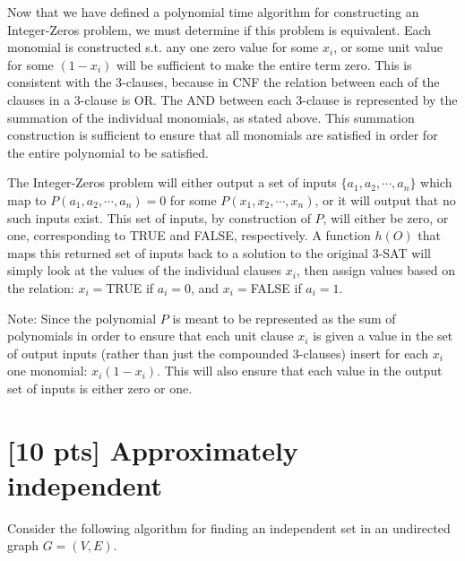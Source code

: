 \documentclass[11pt]{article}
\begin{document}
Now that we have defined a polynomial time algorithm for constructing an Integer-Zeros problem, 
we must determine if this problem is equivalent. Each monomial is constructed s.t. any one
zero value for some $x_i$, or some unit value for some $(1-x_i)$ will be sufficient to make the entire term zero.
This is consistent with the 3-clauses, because in CNF the relation between each of the clauses in a 3-clause 
is OR. The AND between each 3-clause is represented by the summation of the individual monomials, as stated
above. This summation construction is sufficient to ensure that all monomials are satisfied in order for the
entire polynomial to be satisfied.

The Integer-Zeros problem will either output a set of inputs 
$\{a_1,a_2,\cdots,a_n\}$ which map to $P(a_1,a_2,\cdots,a_n)=0$ for some $P(x_1,x_2,\cdots,x_n)$,
or it will output that no such inputs exist. This set of inputs, by construction of $P$, 
will either be zero, or one, corresponding to TRUE and FALSE, respectively. 
A function $h(O)$ that maps this returned set of inputs back to a solution to the
original 3-SAT will simply look at the values of the individual clauses $x_i$, then assign
values based on the relation:
$x_i=$TRUE if $a_i=0$, and $x_i=$FALSE if $a_i=1$. 

Note: Since the polynomial $P$ is meant to be represented as the sum of polynomials
in order to ensure that each unit clause $x_i$ is given a value in the set of output inputs 
(rather than just the compounded 3-clauses) insert for each $x_i$ one monomial:
$x_i(1-x_i)$. This will also ensure that each value in the output set of inputs is either
zero or one. 

\label{pg:end-of-p3}

% 

\newpage

\section{[10 pts] Approximately independent}

Consider the following algorithm for finding an independent set in an 
undirected graph $G=(V,E)$.
\end{document}

